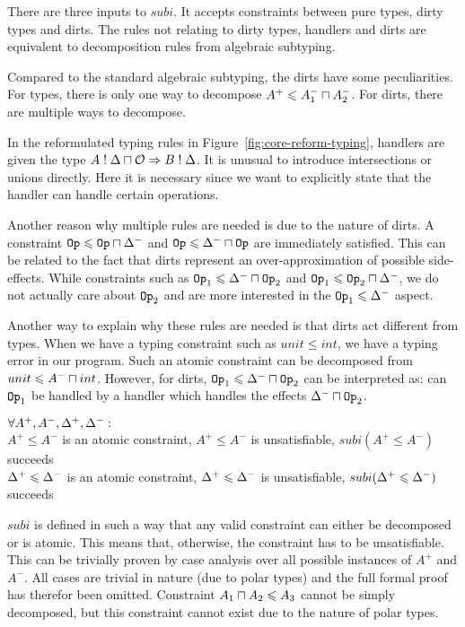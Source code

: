 There are three inputs to $subi$. It accepts constraints between pure types, dirty types and dirts. The rules not relating to dirty types, handlers and dirts are equivalent to decomposition rules from algebraic subtyping.

Compared to the standard algebraic subtyping, the dirts have some peculiarities. For types, there is only one way to decompose $A^+ \leqslant A^-_1 \sqcap A^-_2$. For dirts, there are multiple ways to decompose. 

In the reformulated typing rules in Figure~\ref{fig:core-reform-typing}, handlers are given the type $A \mathrel{!} \Delta \sqcap \mathcal{O} \Rightarrow B \mathrel{!} \Delta$. It is unusual to introduce intersections or unions directly. Here it is necessary since we want to explicitly state that the handler can handle certain operations. 

Another reason why multiple rules are needed is due to the nature of dirts. A constraint $\mathtt{Op} \leqslant \mathtt{Op} \sqcap \Delta^-$ and $\mathtt{Op} \leqslant \Delta^- \sqcap \mathtt{Op}$ are immediately satisfied. This can be related to the fact that dirts represent an over-approximation of possible side-effects.  While constraints such as $\mathtt{Op}_1 \leqslant \Delta^- \sqcap \mathtt{Op}_2$ and $\mathtt{Op}_1 \leqslant \mathtt{Op}_2 \sqcap \Delta^-$, we do not actually care about $\mathtt{Op}_2$ and are more interested in the $\mathtt{Op}_1 \leqslant \Delta^-$ aspect. 

Another way to explain why these rules are needed is that dirts act different from types. When we have a typing constraint such as $unit \le int$, we have a typing error in our program. Such an atomic constraint can be decomposed from $unit \leqslant A^- \sqcap int$. However, for dirts, $\mathtt{Op}_1 \leqslant \Delta^- \sqcap \mathtt{Op}_2$ can be interpreted as: can $\mathtt{Op}_1$ be handled by a handler which handles the effects $\Delta^- \sqcap \mathtt{Op}_2$. 

\begin{prop}
\label{prop:constraint}
$\forall A^+, A^-, \Delta^+, \Delta^-: $\\
$A^+ \le A^-$ is an atomic constraint, 
$A^+ \le A^-$ is unsatisfiable,
$subi(A^+ \le A^-)$ succeeds\\
$\Delta^+ \leqslant \Delta^-$ is an atomic constraint, 
$\Delta^+ \leqslant \Delta^-$ is unsatisfiable, 
$subi(\Delta^+ \leqslant \Delta^-)$ succeeds
\end{prop}
$subi$ is defined in such a way that any valid constraint can either be decomposed or is atomic. This means that, otherwise, the constraint has to be unsatisfiable. This can be trivially proven by case analysis over all possible instances of $A^+$ and $A^-$. All cases are trivial in nature (due to polar types) and the full formal proof has therefor been omitted. Constraint $A_1 \sqcap A_2 \leqslant A_3$ cannot be simply decomposed, but this constraint cannot exist due to the nature of polar types.

